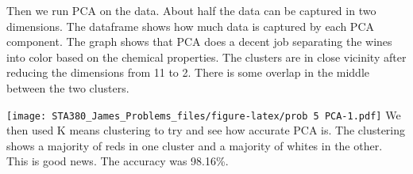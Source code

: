 \documentclass[
]{article}
\newenvironment{Shaded}{\begin{snugshade}}{\end{snugshade}}
\newcommand{\AttributeTok}[1]{\textcolor[rgb]{0.13,0.29,0.53}{#1}}
\newcommand{\CommentTok}[1]{\textcolor[rgb]{0.56,0.35,0.01}{\textit{#1}}}
\newcommand{\ConstantTok}[1]{\textcolor[rgb]{0.56,0.35,0.01}{#1}}
\newcommand{\DecValTok}[1]{\textcolor[rgb]{0.00,0.00,0.81}{#1}}
\newcommand{\FunctionTok}[1]{\textcolor[rgb]{0.13,0.29,0.53}{\textbf{#1}}}
\newcommand{\NormalTok}[1]{#1}
\newcommand{\OtherTok}[1]{\textcolor[rgb]{0.56,0.35,0.01}{#1}}
\newcommand{\SpecialCharTok}[1]{\textcolor[rgb]{0.81,0.36,0.00}{\textbf{#1}}}
\newcommand{\StringTok}[1]{\textcolor[rgb]{0.31,0.60,0.02}{#1}}
\begin{document}
Then we run PCA on the data. About half the data can be captured in two
dimensions. The dataframe shows how much data is captured by each PCA
component. The graph shows that PCA does a decent job separating the
wines into color based on the chemical properties. The clusters are in
close vicinity after reducing the dimensions from 11 to 2. There is some
overlap in the middle between the two clusters.

\begin{Shaded}
\end{Shaded}

\texttt{[image: STA380\_James\_Problems\_files/figure-latex/prob 5 PCA-1.pdf]}
We then used K means clustering to try and see how accurate PCA is. The
clustering shows a majority of reds in one cluster and a majority of
whites in the other. This is good news. The accuracy was 98.16\%.
\end{document}
